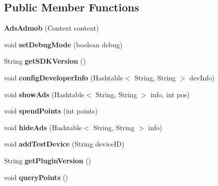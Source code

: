 \subsection*{Public Member Functions}
\begin{DoxyCompactItemize}
\item 
\mbox{\label{classorg_1_1cocos2dx_1_1plugin_1_1AdsAdmob_abd381a5dc3da50dc5472962af650c498}} 
{\bfseries Ads\+Admob} (Context context)
\item 
\mbox{\label{classorg_1_1cocos2dx_1_1plugin_1_1AdsAdmob_a9a6aba2e0755bee54112d61098ae04e0}} 
void {\bfseries set\+Debug\+Mode} (boolean debug)
\item 
\mbox{\label{classorg_1_1cocos2dx_1_1plugin_1_1AdsAdmob_a81942fd36f02afa2c7cc096960d29fbc}} 
String {\bfseries get\+S\+D\+K\+Version} ()
\item 
\mbox{\label{classorg_1_1cocos2dx_1_1plugin_1_1AdsAdmob_a208021eedc7042e6d076a5b6b5128446}} 
void {\bfseries config\+Developer\+Info} (Hashtable$<$ String, String $>$ dev\+Info)
\item 
\mbox{\label{classorg_1_1cocos2dx_1_1plugin_1_1AdsAdmob_ab816d631a2082c6e2b8c36a620ee2082}} 
void {\bfseries show\+Ads} (Hashtable$<$ String, String $>$ info, int pos)
\item 
\mbox{\label{classorg_1_1cocos2dx_1_1plugin_1_1AdsAdmob_a706e49a506566cb331859f6e1cc9cbab}} 
void {\bfseries spend\+Points} (int points)
\item 
\mbox{\label{classorg_1_1cocos2dx_1_1plugin_1_1AdsAdmob_a4f7d8b1d239057454ef3dcef15095e67}} 
void {\bfseries hide\+Ads} (Hashtable$<$ String, String $>$ info)
\item 
\mbox{\label{classorg_1_1cocos2dx_1_1plugin_1_1AdsAdmob_a9ad15896c56f4310fe5046cd250f9a13}} 
void {\bfseries add\+Test\+Device} (String device\+ID)
\item 
\mbox{\label{classorg_1_1cocos2dx_1_1plugin_1_1AdsAdmob_aeaa278b3c74e8e282be3757d6b6e6bed}} 
String {\bfseries get\+Plugin\+Version} ()
\item 
\mbox{\label{classorg_1_1cocos2dx_1_1plugin_1_1AdsAdmob_ad25414da8df2a0f2f5c85ffbe1b4b93e}} 
void {\bfseries query\+Points} ()
\end{DoxyCompactItemize}
